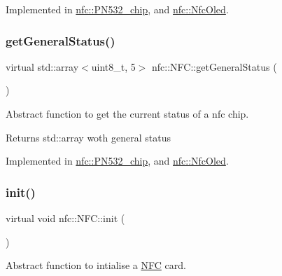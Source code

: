 Implemented in \hyperlink{classnfc_1_1PN532__chip_a00764b6b9472c89430bb1503ec1bf08b}{nfc\+::\+P\+N532\+\_\+chip}, and \hyperlink{classnfc_1_1NfcOled_add83fefdd3a5eadc6f85617173d08336}{nfc\+::\+Nfc\+Oled}.

\mbox{\label{classnfc_1_1NFC_a4ee83726542bf5f25eacb9feaccefd28}} 
\subsubsection{\texorpdfstring{get\+General\+Status()}{getGeneralStatus()}}
{\footnotesize\ttfamily virtual std\+::array$<$uint8\+\_\+t, 5$>$ nfc\+::\+N\+F\+C\+::get\+General\+Status (\begin{DoxyParamCaption}{ }\end{DoxyParamCaption})\hspace{0.3cm}{\ttfamily [pure virtual]}}



Abstract function to get the current status of a nfc chip. 

\begin{DoxyReturn}{Returns}
std\+::array woth general status 
\end{DoxyReturn}


Implemented in \hyperlink{classnfc_1_1PN532__chip_a9ffef9f3b2982346499703361c6e7d5c}{nfc\+::\+P\+N532\+\_\+chip}, and \hyperlink{classnfc_1_1NfcOled_a037638d75c50a76c7f62d0e69cb44cdb}{nfc\+::\+Nfc\+Oled}.

\mbox{\label{classnfc_1_1NFC_a9893c1b762ed0c6796afcde7733bd8cc}} 
\subsubsection{\texorpdfstring{init()}{init()}}
{\footnotesize\ttfamily virtual void nfc\+::\+N\+F\+C\+::init (\begin{DoxyParamCaption}{ }\end{DoxyParamCaption})\hspace{0.3cm}{\ttfamily [pure virtual]}}



Abstract function to intialise a \hyperlink{classnfc_1_1NFC}{N\+FC} card. 

